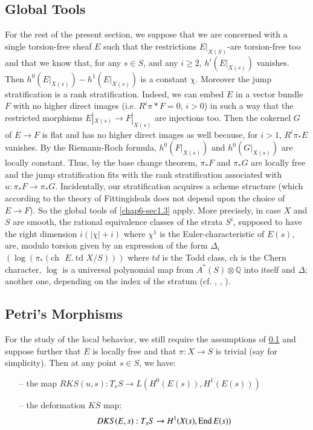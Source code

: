 \subsection{Global Tools}\label{chap6-sec7.6}

For the rest of the present section, we suppose that we are concerned
with a single torsion-free sheaf $E$ such that the restrictions
$E|_{X(S)}$-are torsion-free too and that we know that, for any $s\in
S$, and any $i\geq 2$, $h^{i}(E|_{X(s)})$ vanishes. Then
$h^{0}(E|_{X(s)})-h^{1}(E|_{X(s)})$ is a constant $\chi$. Moreover the
jump stratification is a rank stratification. Indeed, we can embed $E$
in a vector bundle $F$ with no higher direct images
(i.e. $R^{i}\pi\ast F=0$, $i>0$) in such a way that the restricted
morphisms $E|_{X(s)}\to F|_{X(s)}$ are injections too. Then the
cokernel $G$ of $E\to F$ is flat and has no higher direct images as
well because, for $i>1$, $R^{i}\pi_{\ast}E$ vanishes. By the
Riemann-Roch formula, $h^{0}(F|_{X(s)})$ and $h^{0}(G|_{X(s)})$ are
locally constant. Thus, by the base change theorem, $\pi_{\ast}F$ and
$\pi_{\ast}G$ are locally free and the jump stratification fits with
the rank stratification associated with
$u:\pi_{\ast}F\to \pi_{\ast}G$. Incidentally, our stratification
acquires a scheme structure (which according to the theory of
Fitting\pageoriginale ideals does not depend upon the choice of $E\to
F$). So the global tools of \ref{chap6-sec1.3} apply. More precisely,
in case $X$ and $S$ are smooth, the rational equivalence classes of
the strata $S^{i}$, supposed to have the right dimension $i(|\chi|+i)$
where $\chi^{1}$ is the Euler-characteristic of $E(s)$, are, modulo
torsion given by an expression of the form $\Delta_{i}$
$(\log(\pi_{\ast}(\text{ch~ }E.\ \text{td~} X/S)))$ where $td$ is the
Todd class, ch is the Chern character, $\log$ is a universal
polynomial map from $A^{*}(S)\otimes \mathbb{Q}$ into itself and
$\Delta$; another one, depending on the index of the stratum
(cf. \cite{chap6-GP3}, \cite{chap6-BS}, \cite{chap6-BH3}).

\subsection{Petri's Morphisms}\label{chap6-sec7.7}

For the study of the local behavior, we still require the assumptions
of \ref{chap6-sec7.6} and suppose further that $E$ is locally free and
that $\pi:X\to S$ is trivial (say for simplicity). Then at any point
$s\in S$, we have:
\begin{itemize}
\item[--] the map $RKS(u,s):T_{s}S\to L(H^{0}(E(s)),H^{1}(E(s)))$

\item[--] the deformation $KS$ map:
$$
DKS(E,s):T_{s}S\to H^{1}(X(s),\operatorname{End} E(s))
$$
\end{itemize}


